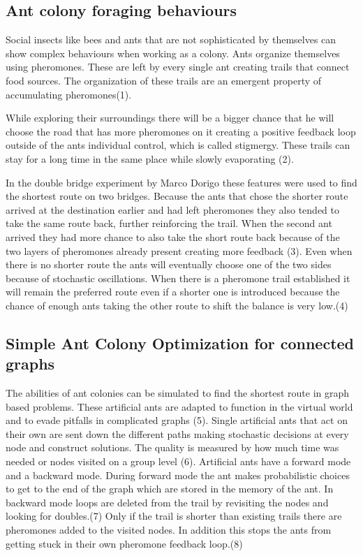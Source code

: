 \subsection{Ant colony foraging behaviours}

Social insects like bees and ants that are not sophisticated by themselves can show complex behaviours when working as a colony. Ants organize themselves using pheromones. These are left by every single ant creating trails that connect food sources. The organization of these trails are an emergent property of accumulating pheromones(1). 

While exploring their surroundings there will be a bigger chance that he will choose the road that has more pheromones on it creating a positive feedback loop outside of the ants individual control, which is called stigmergy. These trails can stay for a long time in the same place while slowly evaporating (2). 

In the double bridge experiment by Marco Dorigo these features were used to find the shortest route on two bridges. Because the ants that chose the shorter route arrived at the destination earlier and had left pheromones they also tended to take the same route back, further reinforcing the trail. When the second ant arrived they had more chance to also take the short route back because of the two layers of pheromones already present creating more feedback (3). Even when there is no shorter route the ants will eventually choose one of the two sides because of stochastic oscillations. When there is a pheromone trail established it will remain the preferred route even if a shorter one is introduced because the chance of enough ants taking the other route to shift the balance is very low.(4)

\subsection{Simple Ant Colony Optimization for connected graphs}

The abilities of ant colonies can be simulated to find the shortest route in graph based problems. These artificial ants are adapted to function in the virtual world and to evade pitfalls in complicated graphs (5).  
Single artificial ants that act on their own are sent down the different paths making stochastic decisions at every node and construct solutions. The quality is measured by how much time was needed or nodes visited on a group level (6). Artificial ants have a forward mode and a backward mode. During forward mode the ant makes probabilistic choices to get to the end of the graph which are stored in the memory of the ant. In backward mode loops are deleted from the trail by revisiting the nodes and looking for doubles.(7) Only if the trail is shorter than existing trails there are pheromones added to the visited nodes. In addition this stops the ants from getting stuck in their own pheromone feedback loop.(8) 

